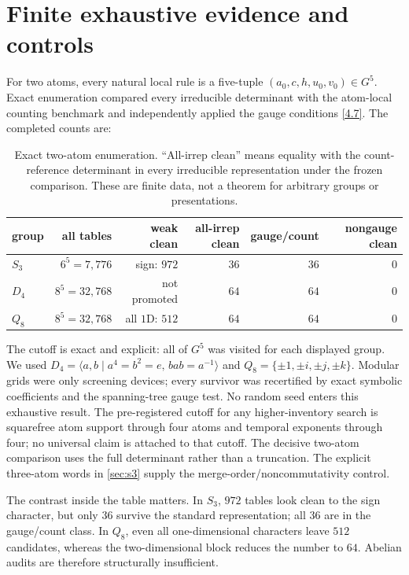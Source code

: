 \section{Finite exhaustive evidence and controls}
\label{sec:evidence}

For two atoms, every natural local rule is a five-tuple
$(a_0,c,h,u_0,v_0)\in G^5$.  Exact enumeration compared every irreducible
determinant with the atom-local counting benchmark and independently applied
the gauge conditions \eqref{4.7}.  The completed counts are:

\begin{table}[h]
\centering
\small
\begin{tabular}{lrrrrr}
\toprule
group & all tables & weak clean & all-irrep clean & gauge/count & nongauge clean\\
\midrule
$S_3$ & $6^5=7{,}776$ & sign: $972$ & $36$ & $36$ & $0$\\
$D_4$ & $8^5=32{,}768$ & not promoted & $64$ & $64$ & $0$\\
$Q_8$ & $8^5=32{,}768$ & all $1$D: $512$ & $64$ & $64$ & $0$\\
\bottomrule
\end{tabular}
\caption{Exact two-atom enumeration.  “All-irrep clean” means equality with
the count-reference determinant in every irreducible representation under
the frozen comparison.  These are finite data, not a theorem for arbitrary
groups or presentations.}
\label{tab:enumeration}
\end{table}

The cutoff is exact and explicit: all of $G^5$ was visited for each displayed
group.  We used
$D_4=\langle a,b\mid a^4=b^2=e,\,bab=a^{-1}\rangle$ and
$Q_8=\{\pm1,\pm i,\pm j,\pm k\}$.  Modular grids were only screening
devices; every survivor was recertified by exact symbolic coefficients and
the spanning-tree gauge test.  No random seed enters this exhaustive result.
The pre-registered cutoff for any higher-inventory search is squarefree atom
support through four atoms and temporal exponents through four; no universal
claim is attached to that cutoff.  The decisive two-atom comparison uses the
full determinant rather than a truncation.  The explicit three-atom words in
\cref{sec:s3} supply the merge-order/noncommutativity control.

The contrast inside the table matters.  In $S_3$, $972$ tables look clean
to the sign character, but only $36$ survive the standard representation;
all $36$ are in the gauge/count class.  In $Q_8$, even all one-dimensional
characters leave $512$ candidates, whereas the two-dimensional block reduces
the number to $64$.  Abelian audits are therefore structurally insufficient.

